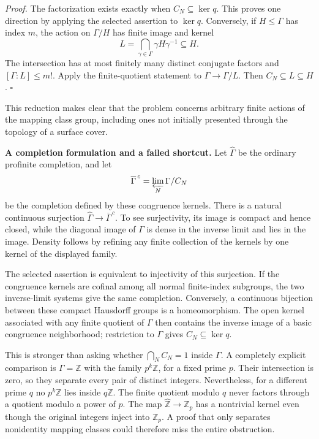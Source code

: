 \documentclass[11pt]{article}
\begin{document}
\emph{Proof.} The factorization exists exactly when $C_N\subseteq\ker q$. This proves one direction by applying the selected assertion to $\ker q$. Conversely, if $H\leq\Gamma$ has index $m$, the action on $\Gamma/H$ has finite image and kernel
\[
 L=\bigcap_{\gamma\in\Gamma}\gamma H\gamma^{-1}\subseteq H.
\]
The intersection has at most finitely many distinct conjugate factors and $[\Gamma:L]\leq m!$. Apply the finite-quotient statement to $\Gamma\to\Gamma/L$. Then $C_N\subseteq L\subseteq H$. $\square$

This reduction makes clear that the problem concerns arbitrary finite actions of the mapping class group, including ones not initially presented through the topology of a surface cover.

\textbf{A completion formulation and a failed shortcut.} Let $\widehat\Gamma$ be the ordinary profinite completion, and let
\[
 \overline\Gamma^{\,c}=\varprojlim_N\Gamma/C_N
\]
be the completion defined by these congruence kernels. There is a natural continuous surjection $\widehat\Gamma\to\overline\Gamma^{\,c}$. To see surjectivity, its image is compact and hence closed, while the diagonal image of $\Gamma$ is dense in the inverse limit and lies in the image. Density follows by refining any finite collection of the kernels by one kernel of the displayed family.

The selected assertion is equivalent to injectivity of this surjection. If the congruence kernels are cofinal among all normal finite-index subgroups, the two inverse-limit systems give the same completion. Conversely, a continuous bijection between these compact Hausdorff groups is a homeomorphism. The open kernel associated with any finite quotient of $\Gamma$ then contains the inverse image of a basic congruence neighborhood; restriction to $\Gamma$ gives $C_N\subseteq\ker q$.

This is stronger than asking whether $\bigcap_N C_N=1$ inside $\Gamma$. A completely explicit comparison is $\Gamma=\mathbb Z$ with the family $p^k\mathbb Z$, for a fixed prime $p$. Their intersection is zero, so they separate every pair of distinct integers. Nevertheless, for a different prime $q$ no $p^k\mathbb Z$ lies inside $q\mathbb Z$. The finite quotient modulo $q$ never factors through a quotient modulo a power of $p$. The map $\widehat{\mathbb Z}\to\mathbb Z_p$ has a nontrivial kernel even though the original integers inject into $\mathbb Z_p$. A proof that only separates nonidentity mapping classes could therefore miss the entire obstruction.
\end{document}
